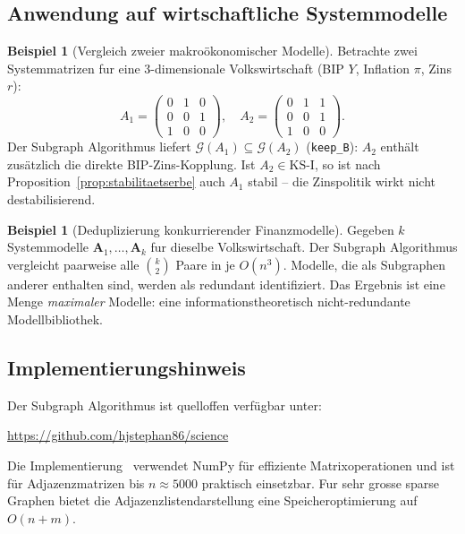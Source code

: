 \documentclass[a4paper, 12pt, twoside, openright]{report}
\theoremstyle{definition}
\newtheorem{example}[theorem]{Beispiel}
\theoremstyle{definition}
\newcommand{\vA}{\bm{A}}
\newcommand{\KS}{\mathrm{KS}}
\begin{document}
\subsection{Anwendung auf wirtschaftliche Systemmodelle}

\begin{example}[Vergleich zweier makroökonomischer Modelle]
Betrachte zwei Systemmatrizen fur eine 3-dimensionale Volkswirtschaft
(BIP $Y$, Inflation $\pi$, Zins $r$):
\[
  A_1 = \begin{pmatrix} 0 & 1 & 0 \\ 0 & 0 & 1 \\ 1 & 0 & 0 \end{pmatrix},
  \quad
  A_2 = \begin{pmatrix} 0 & 1 & 1 \\ 0 & 0 & 1 \\ 1 & 0 & 0 \end{pmatrix}.
\]
Der Subgraph Algorithmus liefert $\mathcal{G}(A_1) \subseteq \mathcal{G}(A_2)$
(\texttt{keep\_B}): $A_2$ enthält zusätzlich die direkte BIP-Zins-Kopplung.
Ist $A_2 \in \KS\text{-I}$, so ist nach Proposition~\ref{prop:stabilitaetserbe}
auch $A_1$ stabil -- die Zinspolitik wirkt nicht destabilisierend.
\end{example}

\begin{example}[Deduplizierung konkurrierender Finanzmodelle]
Gegeben $k$ Systemmodelle $\vA_1,\ldots,\vA_k$ fur dieselbe Volkswirtschaft.
Der Subgraph Algorithmus vergleicht paarweise alle $\binom{k}{2}$ Paare in je
$O(n^3)$. Modelle, die als Subgraphen anderer enthalten sind, werden als
redundant identifiziert. Das Ergebnis ist eine Menge \emph{maximaler} Modelle:
eine informationstheoretisch nicht-redundante Modellbibliothek.
\end{example}

\subsection{Implementierungshinweis}

Der Subgraph Algorithmus ist quelloffen verfügbar unter:
\begin{center}
\url{https://github.com/hjstephan86/science}
\end{center}
Die Implementierung~\citep{epp2026subgraph} verwendet NumPy für effiziente
Matrixoperationen und ist für Adjazenzmatrizen bis $n \approx 5000$ praktisch
einsetzbar. Fur sehr grosse sparse Graphen bietet die Adjazenzlistendarstellung
eine Speicheroptimierung auf $O(n + m)$.
\end{document}
